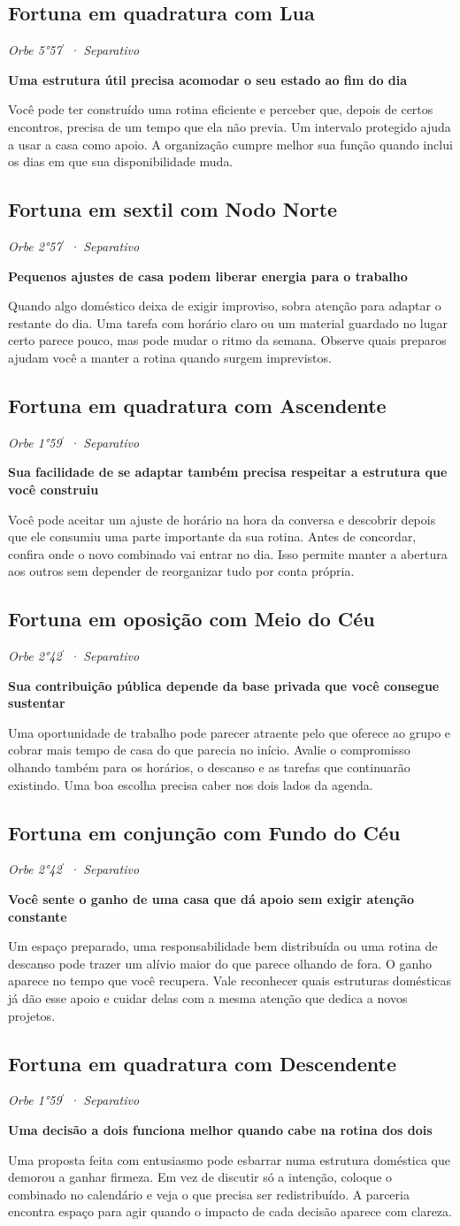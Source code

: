 \documentclass[11pt,a4paper]{article}
\newcommand{\leitura}[3]{\subsection{#1}\textit{#2}\par #3}
\newcommand{\subtituloleitura}[1]{\textbf{#1}\par\nopagebreak[4]}
\begin{document}
\leitura{Fortuna em quadratura com Lua}{Orbe 5°57\ensuremath{^{\prime}} · Separativo}{
\subtituloleitura{Uma estrutura útil precisa acomodar o seu estado ao fim do dia}
Você pode ter construído uma rotina eficiente e perceber que, depois de certos encontros, precisa de um tempo que ela não previa. Um intervalo protegido ajuda a usar a casa como apoio. A organização cumpre melhor sua função quando inclui os dias em que sua disponibilidade muda.
}

\leitura{Fortuna em sextil com Nodo Norte}{Orbe 2°57\ensuremath{^{\prime}} · Separativo}{
\subtituloleitura{Pequenos ajustes de casa podem liberar energia para o trabalho}
Quando algo doméstico deixa de exigir improviso, sobra atenção para adaptar o restante do dia. Uma tarefa com horário claro ou um material guardado no lugar certo parece pouco, mas pode mudar o ritmo da semana. Observe quais preparos ajudam você a manter a rotina quando surgem imprevistos.
}

\leitura{Fortuna em quadratura com Ascendente}{Orbe 1°59\ensuremath{^{\prime}} · Separativo}{
\subtituloleitura{Sua facilidade de se adaptar também precisa respeitar a estrutura que você construiu}
Você pode aceitar um ajuste de horário na hora da conversa e descobrir depois que ele consumiu uma parte importante da sua rotina. Antes de concordar, confira onde o novo combinado vai entrar no dia. Isso permite manter a abertura aos outros sem depender de reorganizar tudo por conta própria.
}

\leitura{Fortuna em oposição com Meio do Céu}{Orbe 2°42\ensuremath{^{\prime}} · Separativo}{
\subtituloleitura{Sua contribuição pública depende da base privada que você consegue sustentar}
Uma oportunidade de trabalho pode parecer atraente pelo que oferece ao grupo e cobrar mais tempo de casa do que parecia no início. Avalie o compromisso olhando também para os horários, o descanso e as tarefas que continuarão existindo. Uma boa escolha precisa caber nos dois lados da agenda.
}

\leitura{Fortuna em conjunção com Fundo do Céu}{Orbe 2°42\ensuremath{^{\prime}} · Separativo}{
\subtituloleitura{Você sente o ganho de uma casa que dá apoio sem exigir atenção constante}
Um espaço preparado, uma responsabilidade bem distribuída ou uma rotina de descanso pode trazer um alívio maior do que parece olhando de fora. O ganho aparece no tempo que você recupera. Vale reconhecer quais estruturas domésticas já dão esse apoio e cuidar delas com a mesma atenção que dedica a novos projetos.
}

\leitura{Fortuna em quadratura com Descendente}{Orbe 1°59\ensuremath{^{\prime}} · Separativo}{
\subtituloleitura{Uma decisão a dois funciona melhor quando cabe na rotina dos dois}
Uma proposta feita com entusiasmo pode esbarrar numa estrutura doméstica que demorou a ganhar firmeza. Em vez de discutir só a intenção, coloque o combinado no calendário e veja o que precisa ser redistribuído. A parceria encontra espaço para agir quando o impacto de cada decisão aparece com clareza.
}
\end{document}
